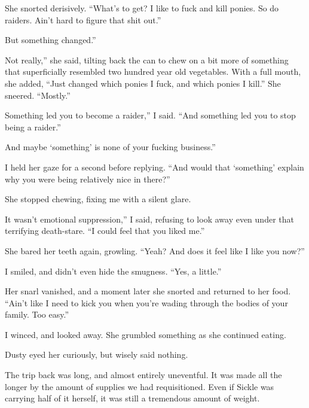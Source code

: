 She snorted derisively. “What’s to get? I like to fuck and kill ponies. So do raiders. Ain’t hard to figure that shit out.”

\leavevmode{}But something changed.”

\leavevmode{}Not really,” she said, tilting back the can to chew on a bit more of something that superficially resembled two hundred year old vegetables. With a full mouth, she added, “Just changed which ponies I fuck, and which ponies I kill.” She sneered. “Mostly.”

\leavevmode{}Something led you to become a raider,” I said. “And something led you to stop being a raider.”

\leavevmode{}And maybe ‘something’ is none of your fucking business.”

I held her gaze for a second before replying. “And would that ‘something’ explain why you were being relatively nice in there?”

She stopped chewing, fixing me with a silent glare.

\leavevmode{}It wasn’t emotional suppression,” I said, refusing to look away even under that terrifying death-stare. “I could feel that you liked me.”

She bared her teeth again, growling. “Yeah? And does it feel like I like you now?”

I smiled, and didn’t even hide the smugness. “Yes, a little.”

Her snarl vanished, and a moment later she snorted and returned to her food. “Ain’t like I need to kick you when you’re wading through the bodies of your family. Too easy.”

I winced, and looked away. She grumbled something as she continued eating.

Dusty eyed her curiously, but wisely said nothing.

{\br}%
The trip back was long, and almost entirely uneventful. It was made all the longer by the amount of supplies we had requisitioned. Even if Sickle was carrying half of it herself, it was still a tremendous amount of weight.

